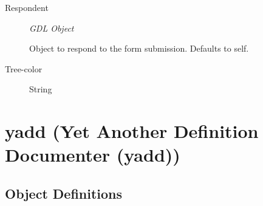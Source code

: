\documentclass [11pt]{book}
\begin{document}
\begin{itemize}
\begin{description}
\item [Respondent]
\emph{GDL Object}

 Object to respond to the form submission. Defaults to self.




\item [Tree-color]

String




\end{description}







\end{itemize}





\section{yadd (Yet Another Definition Documenter (yadd))}

\label{sec:yadd(yetanotherdefinitiondocumenter(yadd))}





\subsection{Object Definitions}

\label{subsec:objectdefinitions}
\end{document}
